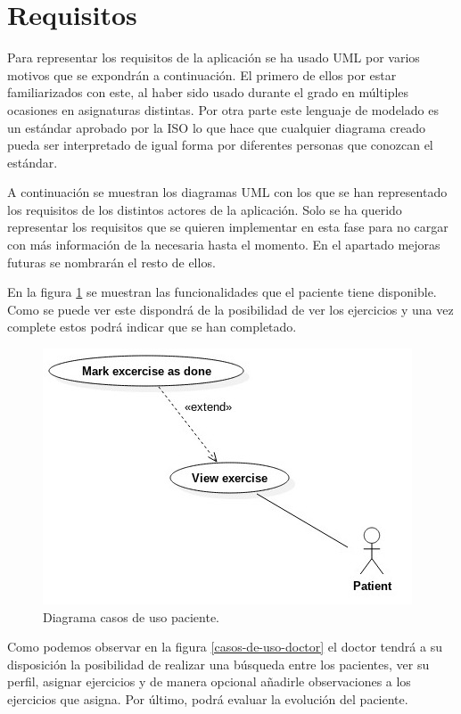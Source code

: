 \section{Requisitos}
Para representar los requisitos de la aplicación se ha usado UML \cite{uml} por varios
motivos que se expondrán a continuación. El primero de ellos por estar familiarizados
con este, al haber sido usado durante el grado en múltiples ocasiones en asignaturas
distintas. Por otra parte este lenguaje de modelado es un estándar aprobado por la ISO
lo que hace que cualquier diagrama creado pueda ser interpretado de igual forma por
diferentes personas que conozcan el estándar.

\medskip
A continuación se muestran los diagramas UML con los que se han representado los
requisitos de los distintos actores de la aplicación. Solo se ha querido representar los
requisitos que se quieren implementar en esta fase para no cargar con más información de
la necesaria hasta el momento. En el apartado mejoras futuras se nombrarán el resto de ellos.

\medskip
En la figura \ref{casos-de-uso-paciente} se muestran las funcionalidades que el paciente
tiene disponible. Como se puede ver este dispondrá de la posibilidad de ver los ejercicios
y una vez complete estos podrá indicar que se han completado.

\begin{figure}
    \includegraphics[width=\linewidth]{./images/requisites/use-case-patient.jpeg}
    \caption{Diagrama casos de uso paciente.}
    \label{casos-de-uso-paciente}
\end{figure}

\medskip
Como podemos observar en la figura \ref{casos-de-uso-doctor} el doctor tendrá a su
disposición la posibilidad de realizar una búsqueda entre los pacientes, ver su perfil,
asignar ejercicios y de manera opcional añadirle observaciones a los ejercicios que
asigna. Por último, podrá evaluar la evolución del paciente.

